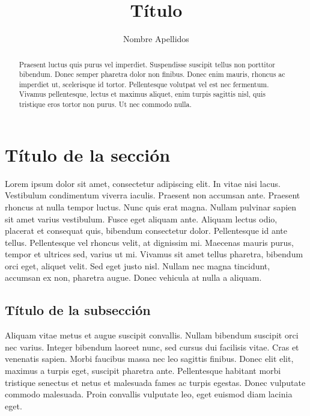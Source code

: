 \documentclass[]{articulo}
\title{Título}
\author{Nombre Apellidos}
\begin{document}
	
\maketitle
	
\begin{abstract}
	Praesent luctus quis purus vel imperdiet. Suspendisse suscipit tellus non porttitor bibendum. Donec semper pharetra dolor non finibus. Donec enim mauris, rhoncus ac imperdiet ut, scelerisque id tortor. Pellentesque volutpat vel est nec fermentum. Vivamus pellentesque, lectus et maximus aliquet, enim turpis sagittis nisl, quis tristique eros tortor non purus. Ut nec commodo nulla.
\end{abstract}

	
\section{Título de la sección}
	
Lorem ipsum dolor sit amet, consectetur adipiscing elit. In vitae nisi lacus. Vestibulum condimentum viverra iaculis. Praesent non accumsan ante. Praesent rhoncus at nulla tempor luctus. Nunc quis erat magna. Nullam pulvinar sapien sit amet varius vestibulum. Fusce eget aliquam ante. Aliquam lectus odio, placerat et consequat quis, bibendum consectetur dolor. Pellentesque id ante tellus. Pellentesque vel rhoncus velit, at dignissim mi. Maecenas mauris purus, tempor et ultrices sed, varius ut mi. Vivamus sit amet tellus pharetra, bibendum orci eget, aliquet velit. Sed eget justo nisl. Nullam nec magna tincidunt, accumsan ex non, pharetra augue. Donec vehicula at nulla a aliquam. 
	
\subsection{Título de la subsección}
	
Aliquam vitae metus et augue suscipit convallis. Nullam bibendum suscipit orci nec varius. Integer bibendum laoreet nunc, sed cursus dui facilisis vitae. Cras et venenatis sapien. Morbi faucibus massa nec leo sagittis finibus. Donec elit elit, maximus a turpis eget, suscipit pharetra ante. Pellentesque habitant morbi tristique senectus et netus et malesuada fames ac turpis egestas. Donec vulputate commodo malesuada. Proin convallis vulputate leo, eget euismod diam lacinia eget.
	
\end{document}
